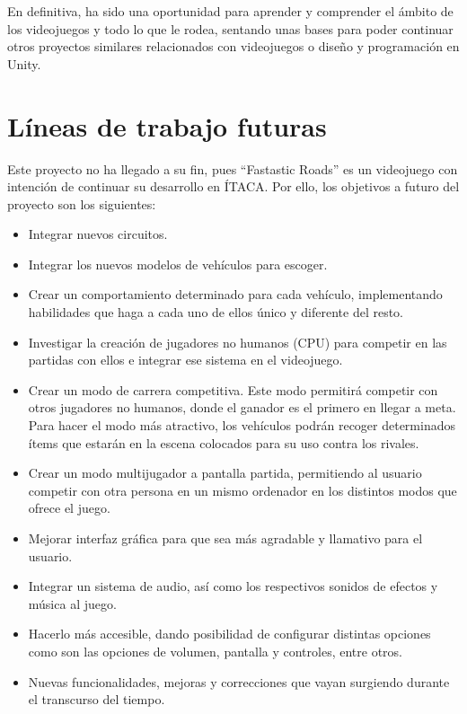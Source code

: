 En definitiva, ha sido una oportunidad para aprender y comprender el ámbito de los videojuegos y todo lo que le rodea, sentando unas bases para poder continuar otros proyectos similares relacionados con videojuegos o diseño y programación en Unity.

\section{Líneas de trabajo futuras}

Este proyecto no ha llegado a su fin, pues ``Fastastic Roads'' es un videojuego con intención de continuar su desarrollo en ÍTACA. Por ello, los objetivos a futuro del proyecto son los siguientes:
\begin{itemize}
\tightlist
    \item Integrar nuevos circuitos.
    \item Integrar los nuevos modelos de vehículos para escoger.
    \item Crear un comportamiento determinado para cada vehículo, implementando habilidades que haga a cada uno de ellos único y diferente del resto.
    \item Investigar la creación de jugadores no humanos (CPU) para competir en las partidas con ellos e integrar ese sistema en el videojuego.
    \item Crear un modo de carrera competitiva. Este modo permitirá competir con otros jugadores no humanos, donde el ganador es el primero en llegar a meta. Para hacer el modo más atractivo, los vehículos podrán recoger determinados ítems que estarán en la escena colocados para su uso contra los rivales.
    \item Crear un modo multijugador a pantalla partida, permitiendo al usuario competir con otra persona en un mismo ordenador en los distintos modos que ofrece el juego.
    \item Mejorar interfaz gráfica para que sea más agradable y llamativo para el usuario.
    \item Integrar un sistema de audio, así como los respectivos sonidos de efectos y música al juego.
    \item Hacerlo más accesible, dando posibilidad de configurar distintas opciones como son las opciones de volumen, pantalla y controles, entre otros.
    \item Nuevas funcionalidades, mejoras y correcciones que vayan surgiendo durante el transcurso del tiempo.
\end{itemize}